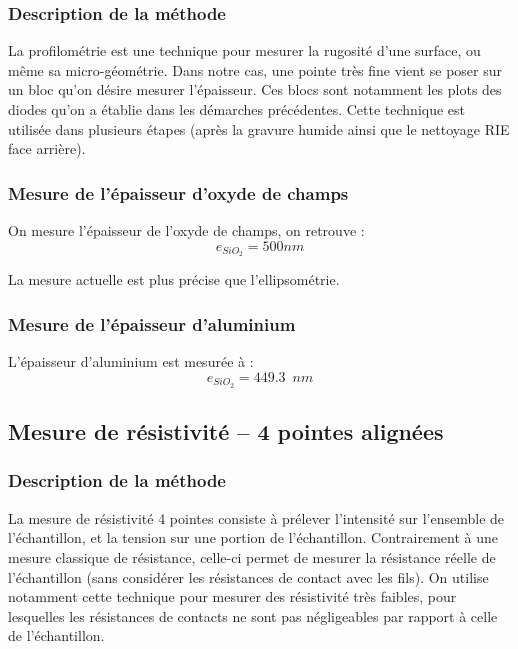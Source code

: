 \documentclass[11pt]{article}
\begin{document}
\subsubsection{Description de la m\'ethode}

La profilom\'etrie est une technique pour mesurer la rugosit\'e d'une surface, ou m\^eme sa micro-g\'eom\'etrie. Dans notre cas, une pointe tr\`es fine vient se poser sur un bloc qu'on d\'esire mesurer l'\'epaisseur. Ces blocs sont notamment les plots des diodes qu'on a \'etablie dans les d\'emarches pr\'ec\'edentes. Cette technique est utilis\'ee dans plusieurs \'etapes (apr\`es la gravure humide ainsi que le nettoyage RIE face arri\`ere). 

\subsubsection{Mesure de l'\'epaisseur d'oxyde de champs} 

On mesure l'\'epaisseur de l'oxyde de champs, on retrouve :
\[
	e_{SiO_{2}} = 500 nm
\]

La mesure actuelle est plus pr\'ecise que l'ellipsom\'etrie.
\subsubsection{Mesure de l'\'epaisseur d'aluminium} 

L'\'epaisseur d'aluminium est mesur\'ee \`a :
\[
	e_{SiO_{2}} = 449.3 \phantom{2} nm
\] 

\subsection{Mesure de r\'esistivit\'e -- 4 pointes align\'ees}

\subsubsection{Description de la m\'ethode}
La mesure de r\'esistivit\'e 4 pointes consiste \`a pr\'elever l'intensit\'e sur l'ensemble de l'\'echantillon, et la tension sur une portion de l'\'echantillon. Contrairement \`a une mesure classique de r\'esistance, celle-ci permet de mesurer la r\'esistance r\'eelle de l'\'echantillon (sans consid\'erer les r\'esistances de contact avec les fils). On utilise notamment cette technique pour mesurer des r\'esistivit\'e tr\`es faibles, pour lesquelles les r\'esistances de contacts ne sont pas n\'egligeables par rapport \`a celle de l'\'echantillon.  
\end{document}
